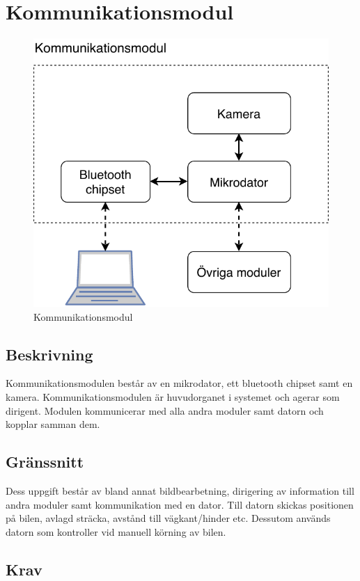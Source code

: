 \documentclass[kravspec/krav.tex]{subfiles}
\begin{document}
\clearpage
\section{Kommunikationsmodul}
\begin{figure}[H]
    \centering
    \includegraphics[width=0.6\linewidth]{kravspec/figures/kommunikationsmodul.pdf}
    \caption{Kommunikationsmodul}
    \label{fig:kommunikationsmodul}
\end{figure}

\subsection{Beskrivning}
Kommunikationsmodulen består av en mikrodator, ett bluetooth chipset samt en
kamera. Kommunikationsmodulen är huvudorganet i systemet och agerar som
dirigent. Modulen kommunicerar med alla andra moduler samt datorn och kopplar
samman dem.

\subsection{Gränssnitt}
Dess uppgift består av bland annat bildbearbetning, dirigering av information
till andra moduler samt kommunikation med en dator. Till datorn skickas
positionen på bilen, avlagd sträcka, avstånd till vägkant/hinder etc. Dessutom
används datorn som kontroller vid manuell körning av bilen.

\subsection{Krav}
\begin{reqlist}
    \req{}
\end{reqlist}

\clearpage
\end{document}
